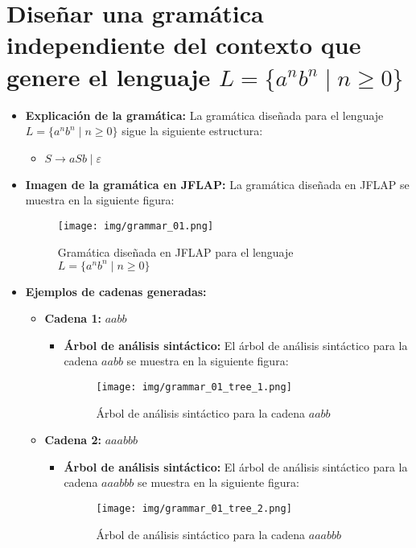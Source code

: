 \documentclass[11pt]{report}
\begin{document}
\section{Diseñar una gramática independiente del contexto que genere el lenguaje \texorpdfstring{$L = \{a^n b^n \mid n \geq 0\}$}{L = \{a^n b^n | n >= 0\}}}
\begin{itemize}
  \item \textbf{Explicación de la gramática:} La gramática diseñada para el lenguaje $L = \{a^n b^n \mid n \geq 0\}$ sigue la siguiente estructura:
  \begin{itemize}
    \item $S \rightarrow aSb \mid \varepsilon$
  \end{itemize}
  \item \textbf{Imagen de la gramática en JFLAP:} La gramática diseñada en JFLAP se muestra en la siguiente figura:
  \begin{figure}[H]
    \centering
    \texttt{[image: img/grammar\_01.png]}
    \caption{Gramática diseñada en JFLAP para el lenguaje $L = \{a^n b^n \mid n \geq 0\}$}
  \end{figure}
  \item \textbf{Ejemplos de cadenas generadas:}
  \begin{itemize}
    \item \textbf{Cadena 1:} $aabb$
    \begin{itemize}
      \item \textbf{Árbol de análisis sintáctico:} El árbol de análisis sintáctico para la cadena $aabb$ se muestra en la siguiente figura:
      \begin{figure}[H]
        \centering
        \texttt{[image: img/grammar\_01\_tree\_1.png]}
        \caption{Árbol de análisis sintáctico para la cadena $aabb$}
        \label{fig:arbol1}
      \end{figure}
    \end{itemize}
    \item \textbf{Cadena 2:} $aaabbb$
    \begin{itemize}
      \item \textbf{Árbol de análisis sintáctico:} El árbol de análisis sintáctico para la cadena $aaabbb$ se muestra en la siguiente figura:
      \begin{figure}[H]
        \centering
        \texttt{[image: img/grammar\_01\_tree\_2.png]}
        \caption{Árbol de análisis sintáctico para la cadena $aaabbb$}
        \label{fig:arbol2}
      \end{figure}

\end{itemize}
\end{itemize}
\end{itemize}
\end{document}
